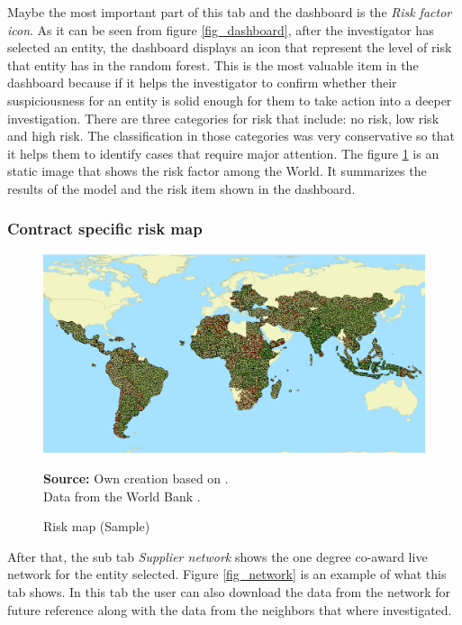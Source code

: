 Maybe the most important part of this tab and the dashboard is the \textit{Risk factor icon}. As it can be seen from figure \ref{fig_dashboard}, after the investigator has selected an entity, the dashboard displays an icon that represent the level of risk that entity has in the random forest. This is the most valuable item in the dashboard because if it helps the investigator to confirm whether their suspiciousness for an entity is solid enough for them to take action into a deeper investigation. There are three categories for risk that include: no risk, low risk and high risk. The classification in those categories was very conservative so that it helps them to identify cases that require major attention. The figure \ref{fig_risk_map} is an static image that shows the risk factor among the World. It summarizes the results of the model and the risk item shown in the dashboard.

\subsubsection{Contract specific risk map}

\begin{figure}[H]
\begin{center}
\caption{Risk map (Sample)}
\label{fig_risk_map}
\includegraphics[width=\textwidth,height=1\textheight,keepaspectratio]{../img/risk_map.pdf}
\end{center}
\noindent \footnotesize{\textbf{Source:} Own creation based on \cite{wb_i_map}. \\Data from the World Bank \parencite{wb_data}.}
\end{figure}



After that, the sub tab \textit{Supplier network} shows the one degree co-award live network for the entity selected. Figure \ref{fig_network} is an example of what this tab shows. In this tab the user can also download the data from the network for future reference along with the data from the neighbors that where investigated.

